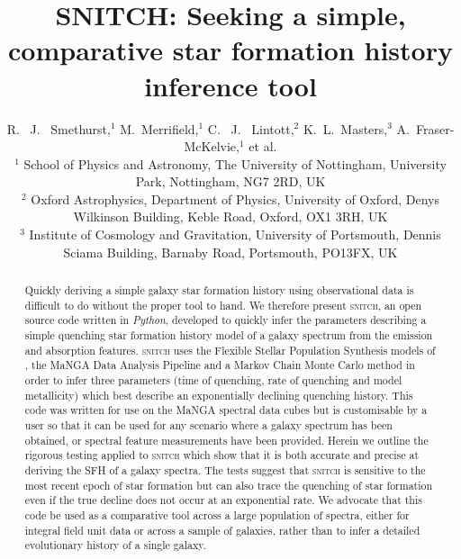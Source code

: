 \documentclass[useAMS,usenatbib]{mn2e}
\begin{document}
\title[\textsc{snitch}: inferring quenching histories]{SNITCH: Seeking a simple, comparative star formation history inference tool}
\author[Smethurst et al. 2018]{R. ~J. ~Smethurst,$^{1}$ M.~Merrifield,$^{1}$ C. ~J. ~Lintott,$^{2}$ K.~L.~Masters,$^{3}$ \newauthor A.~Fraser-McKelvie,$^{1}$ et al.
\\ $^1$ School of Physics and Astronomy, The University of Nottingham, University Park, Nottingham, NG7 2RD, UK
\\ $^2$ Oxford Astrophysics, Department of Physics, University of Oxford, Denys Wilkinson Building, Keble Road, Oxford, OX1 3RH, UK
\\ $^3$ Institute of Cosmology and Gravitation, University of Portsmouth, Dennis Sciama Building, Barnaby Road, Portsmouth, PO13FX, UK
}

\maketitle

\begin{abstract}
Quickly deriving a simple galaxy star formation history using observational data is difficult to do without the proper tool to hand. We therefore present \textsc{snitch}, an open source code written in \emph{Python}, developed to quickly infer the parameters describing a simple quenching star formation history model of a galaxy spectrum from the emission and absorption features. \textsc{snitch} uses the Flexible Stellar Population Synthesis models of \cite{conroy09}, the MaNGA Data Analysis Pipeline and a Markov Chain Monte Carlo method in order to infer three parameters (time of quenching, rate of quenching and model metallicity) which best describe an exponentially declining quenching history. This code was written for use on the MaNGA spectral data cubes but is customisable by a user so that it can be used for any scenario where a galaxy spectrum has been obtained, or spectral feature measurements have been provided. Herein we outline the rigorous testing applied to \textsc{snitch} which show that it is both accurate and precise at deriving the SFH of a galaxy spectra. The tests suggest that \textsc{snitch} is sensitive to the most recent epoch of star formation but can also trace the quenching of star formation even if the true decline does not occur at an exponential rate. We advocate that this code be used as a comparative tool across a large population of spectra, either for integral field unit data or across a sample of galaxies, rather than to infer a detailed evolutionary history of a single galaxy. 
\end{abstract}
\end{document}
